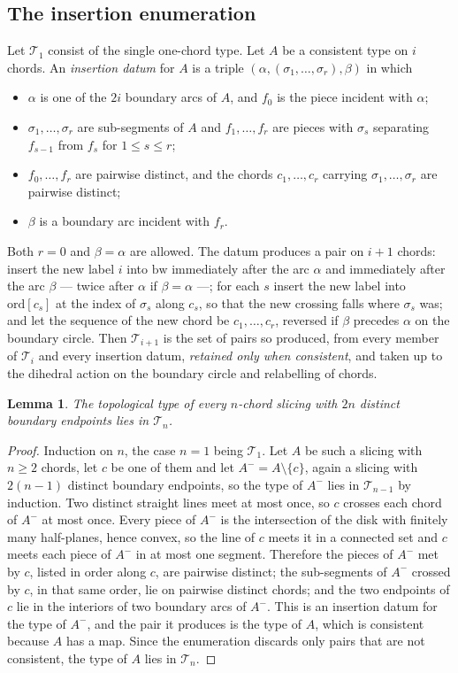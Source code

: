 \documentclass[11pt]{amsart}
\newtheorem{lemma}[theorem]{Lemma}
\theoremstyle{definition}
\theoremstyle{remark}
\newcommand{\Tn}{\mathcal T}
\begin{document}
\subsection*{The insertion enumeration}
Let $\Tn_1$ consist of the single one-chord type. Let $A$ be a consistent type on $i$
chords. An \emph{insertion datum} for $A$ is a triple
$(\alpha,(\sigma_1,\ldots,\sigma_r),\beta)$ in which
\begin{itemize}
\item $\alpha$ is one of the $2i$ boundary arcs of $A$, and $f_0$ is the piece incident
with $\alpha$;
\item $\sigma_1,\ldots,\sigma_r$ are sub-segments of $A$ and $f_1,\ldots,f_r$ are pieces
with $\sigma_s$ separating $f_{s-1}$ from $f_s$ for $1\le s\le r$;
\item $f_0,\ldots,f_r$ are pairwise distinct, and the chords $c_1,\ldots,c_r$ carrying
$\sigma_1,\ldots,\sigma_r$ are pairwise distinct;
\item $\beta$ is a boundary arc incident with $f_r$.
\end{itemize}
Both $r=0$ and $\beta=\alpha$ are allowed. The datum produces a pair on $i+1$ chords:
insert the new label $i$ into $\mathrm{bw}$ immediately after the arc $\alpha$ and
immediately after the arc $\beta$ --- twice after $\alpha$ if $\beta=\alpha$ ---; for each
$s$ insert the new label into $\mathrm{ord}[c_s]$ at the index of $\sigma_s$ along $c_s$,
so that the new crossing falls where $\sigma_s$ was; and let the sequence of the new chord
be $c_1,\ldots,c_r$, reversed if $\beta$ precedes $\alpha$ on the boundary circle. Then
$\Tn_{i+1}$ is the set of pairs so produced, from every member of $\Tn_i$ and every
insertion datum, \emph{retained only when consistent}, and taken up to the dihedral action
on the boundary circle and relabelling of chords.

\begin{lemma}\label{lem:superset}
The topological type of every $n$-chord slicing with $2n$ distinct boundary endpoints
lies in $\Tn_n$.
\end{lemma}

\begin{proof}
Induction on $n$, the case $n=1$ being $\Tn_1$. Let $A$ be such a slicing with $n\ge2$
chords, let $c$ be one of them and let $A^-=A\setminus\{c\}$, again a slicing with
$2(n-1)$ distinct boundary endpoints, so the type of $A^-$ lies in $\Tn_{n-1}$ by
induction. Two distinct straight lines meet at most once, so $c$ crosses each chord of
$A^-$ at most once. Every piece of $A^-$ is the intersection of the disk with finitely
many half-planes, hence convex, so the line of $c$ meets it in a connected set and $c$
meets each piece of $A^-$ in at most one segment. Therefore the pieces of $A^-$ met by
$c$, listed in order along $c$, are pairwise distinct; the sub-segments of $A^-$ crossed
by $c$, in that same order, lie on pairwise distinct chords; and the two endpoints of $c$
lie in the interiors of two boundary arcs of $A^-$. This is an insertion datum for the
type of $A^-$, and the pair it produces is the type of $A$, which is consistent because
$A$ has a map. Since the enumeration discards only pairs that are not consistent, the type
of $A$ lies in $\Tn_n$.
\end{proof}
\end{document}
